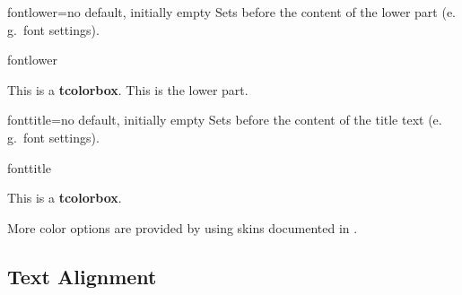 \begin{docTcbKey}{fontlower}{=}{no default, initially empty}
  Sets  before the content of the lower part (e.\,g.\ font settings).
\begin{exdispExample}{fontlower}
\begin{tcolorbox}[fontlower=\sffamily\bfseries]
This is a \textbf{tcolorbox}.
\tcblower
This is the lower part.
\end{tcolorbox}
\end{exdispExample}
\end{docTcbKey}


\begin{docTcbKey}{fonttitle}{=}{no default, initially empty}
  Sets  before the content of the title text (e.\,g.\ font settings).
\begin{exdispExample}{fonttitle}
\begin{tcolorbox}[fonttitle=\sffamily\bfseries\large,title=Hello]
This is a \textbf{tcolorbox}.
\end{tcolorbox}
\end{exdispExample}
\end{docTcbKey}

\bigskip
\begin{marker}
  More color options are provided by using skins documented in
  .
\end{marker}


\clearpage
\subsection{Text Alignment}

